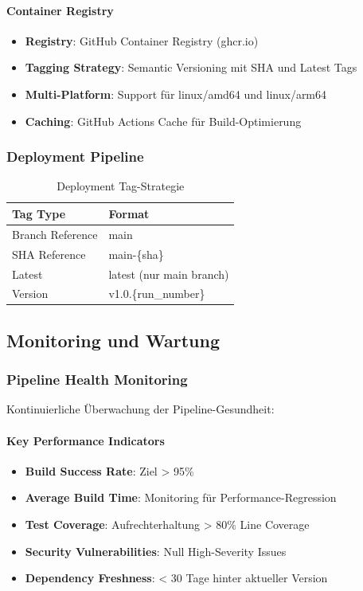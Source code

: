 \paragraph{Container Registry}
\begin{itemize}
    \item \textbf{Registry}: GitHub Container Registry (ghcr.io)
    \item \textbf{Tagging Strategy}: Semantic Versioning mit SHA und Latest Tags
    \item \textbf{Multi-Platform}: Support für linux/amd64 und linux/arm64
    \item \textbf{Caching}: GitHub Actions Cache für Build-Optimierung
\end{itemize}

\subsubsection{Deployment Pipeline}
\begin{table}[h!]
    \centering
    \caption{Deployment Tag-Strategie}
    \label{tab:deployment-tags}
    \begin{tabular}{|l|l|}
    \hline
    \textbf{Tag Type} & \textbf{Format} \\ \hline
    Branch Reference & main \\ \hline
    SHA Reference & main-\{sha\} \\ \hline
    Latest & latest (nur main branch) \\ \hline
    Version & v1.0.\{run\_number\} \\ \hline
    \end{tabular}
\end{table}

\subsection{Monitoring und Wartung}

\subsubsection{Pipeline Health Monitoring}
Kontinuierliche Überwachung der Pipeline-Gesundheit:

\paragraph{Key Performance Indicators}
\begin{itemize}
    \item \textbf{Build Success Rate}: Ziel > 95\%
    \item \textbf{Average Build Time}: Monitoring für Performance-Regression
    \item \textbf{Test Coverage}: Aufrechterhaltung > 80\% Line Coverage
    \item \textbf{Security Vulnerabilities}: Null High-Severity Issues
    \item \textbf{Dependency Freshness}: < 30 Tage hinter aktueller Version
\end{itemize}

